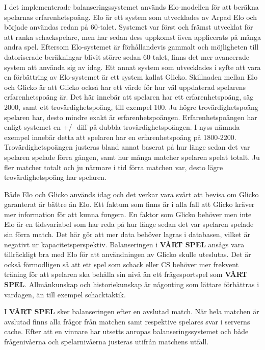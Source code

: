 \documentclass[a4paper, 11pt]{article}
\begin{document}
I det implementerade balanseringssystemet används Elo-modellen för att beräkna spelarnas erfarenhetspoäng. Elo är ett system som utvecklades av Arpad Elo och började användas redan på 60-talet\cite{elo}. Systemet var först och främst utvecklat för att ranka schackspelare, men har sedan dess uppkomst även applicerats på många andra spel. Eftersom Elo-systemet är förhållandevis gammalt och möjligheten till datoriserade beräkningar blivit större sedan 60-talet, finns det mer avancerade system att använda sig av idag. Ett annat system som utvecklades i syfte att vara en förbättring av Elo-systemet är ett system kallat Glicko\cite{chessratings}. Skillnaden mellan Elo och Glicko är att Glicko också har ett värde för hur väl uppdaterad spelarens erfarenhetspoäng är. Det här innebär att spelaren har ett erfarenhetspoäng, säg 2000, samt ett trovärdighetspoäng, till exempel 100. Ju högre trovärdighetspoäng spelaren har, desto mindre exakt är erfarenhetspoängen. Erfarenhetspoängen har enligt systemet en +/- diff på dubbla trovärdighetspoängen. I nyss nämnda exempel innebär detta att spelaren har en erfarenhetspoäng på 1800-2200. Trovärdighetspoängen justeras bland annat baserat på hur länge sedan det var spelaren spelade förra gången, samt hur många matcher spelaren spelat totalt. Ju fler matcher totalt och ju närmare i tid förra matchen var, desto lägre trovärdighetspoäng har spelaren.

Både Elo och Glicko används idag och det verkar vara svårt att bevisa om Glicko garanterat är bättre än Elo\cite{stackchess}. Ett faktum som finns är i alla fall att Glicko kräver mer information för att kunna fungera. En faktor som Glicko behöver men inte Elo är en tidsvariabel som har reda på hur länge sedan det var spelaren spelade sin förra match\cite{glickoex}. Det här gör att mer data behöver lagras i databasen, vilket är negativt ur kapacitetsperspektiv. Balanseringen i \textbf{VÅRT SPEL} ansågs vara tillräckligt bra med Elo för att användningen av Glicko skulle uteslutas. Det är också förmodligen så att ett spel som schack eller CS behöver mer frekvent träning för att spelaren ska behålla sin nivå än ett frågesportspel som \textbf{VÅRT SPEL}. Allmänkunskap och historiekunskap är någonting som lättare förbättras i vardagen, än till exempel schacktaktik. 

I \textbf{VÅRT SPEL} sker balanseringen efter en avslutad match. När hela matchen är avslutad finns alla frågor från matchen samt respektive spelares svar i serverns cache. Efter att en vinnare har utsetts anropas balanseringssystemet och både frågenivåerna och spelarnivåerna justeras utifrån matchens utfall.
\end{document}

